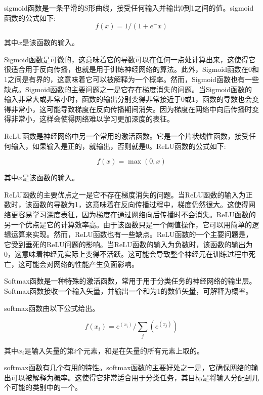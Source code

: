 sigmoid函数是一条平滑的S形曲线，接受任何输入并输出0到1之间的值。sigmoid函数的公式如下:
\begin{equation}
\label{eq:2_15}
f(x) = 1 / (1 + e^-x)
\end{equation}


其中$x$是该函数的输入。

Sigmoid函数是可微的，这意味着它的导数可以在任何一点处计算出来，这使得它很适合用于反向传播，也就是用于训练神经网络的算法。此外，Sigmoid函数在0和1之间是有界的，这意味着它可以被解释为一个概率。然而，Sigmoid函数也有一些缺点。Sigmoid函数的主要问题之一是它存在梯度消失的问题。当Sigmoid函数的输入非常大或非常小时，函数的输出分别变得非常接近于0或1，函数的导数也会变得非常小，这可能导致梯度在反向传播期间消失。因为梯度在网络中向后传播时变得非常小，这样会使得网络难以学习更加深度的表征。


ReLU函数是神经网络中另一个常用的激活函数。它是一个片状线性函数，接受任何输入，如果输入是正的，就输出，否则就是0。ReLU函数的公式如下:

\begin{equation}
\label{eq:2_16}
f(x) = \max(0, x)
\end{equation}


其中$x$是该函数的输入。

ReLU函数的主要优点之一是它不存在梯度消失的问题。当ReLU函数的输入为正数时，该函数的导数为1，这意味着在反向传播过程中，梯度仍然很大。这使得网络更容易学习深度表征，因为梯度在通过网络向后传播时不会消失。ReLU函数的另一个优点是它的计算效率高。由于该函数只是一个阈值操作，它可以用简单的逻辑运算来实现。然而，ReLU函数也有一些缺点。ReLU函数的一个主要问题是，它受到垂死的ReLU问题的影响。当ReLU函数的输入为负数时，该函数的输出为0，这意味着神经元实际上变得不活跃。这可能会导致整个神经元在训练过程中死亡，这可能会对网络的性能产生负面影响。


Softmax函数是一种特殊的激活函数，常用于用于分类任务的神经网络的输出层。Softmax函数接收一个输入矢量，并输出一个和为1的数值矢量，可解释为概率。

softmax函数由以下公式给出。

\begin{equation}
\label{eq:2_16}
f(x_i) = e^(x_i) / \sum _j(e^(x_j))
\end{equation}



其中$x_i$是输入矢量的第$i$个元素，和是在矢量的所有元素上取的。

softmax函数有几个有用的特性。softmax函数的主要好处之一是，它确保网络的输出可以被解释为概率。这使得它非常适合用于分类任务，其目标是将输入分配到几个可能的类别中的一个。


